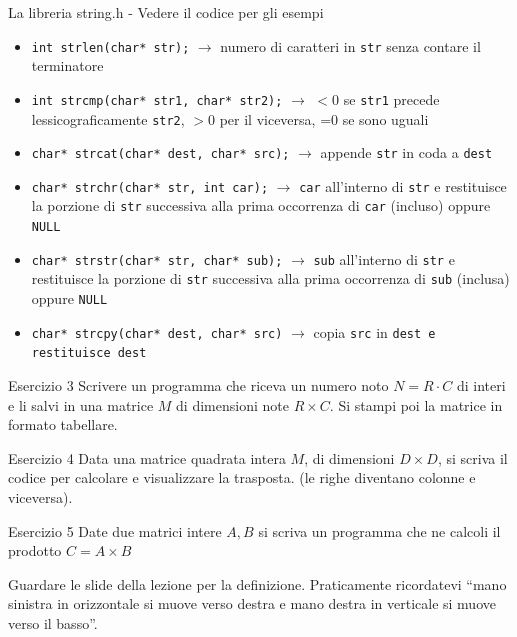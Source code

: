 \documentclass[handout]{beamer}
\begin{document}
\begin{frame}{La libreria string.h - Vedere il codice per gli esempi}
\begin{itemize}
	\item \texttt{int strlen(char* str);} $\rightarrow$ numero di caratteri in \texttt{str} senza contare il terminatore
	\item \texttt{int strcmp(char* str1, char* str2);} $\rightarrow$ $<$0 se \texttt{str1} precede lessicograficamente \texttt{str2}, $>$0 per il viceversa, =0 se sono uguali
	\item \texttt{char* strcat(char* dest, char* src);} $\rightarrow$ appende \texttt{str} in coda a \texttt{dest}
	\item \texttt{char* strchr(char* str, int car);} $\rightarrow$ \texttt{car} all'interno di \texttt{str} e restituisce la porzione di \texttt{str} successiva alla prima occorrenza di \texttt{car} (incluso) oppure \texttt{NULL}
	\item \texttt{char* strstr(char* str, char* sub);} $\rightarrow$ \texttt{sub} all'interno di \texttt{str} e restituisce la porzione di \texttt{str} successiva alla prima occorrenza di \texttt{sub} (inclusa) oppure \texttt{NULL}
	\item \texttt{char* strcpy(char* dest, char* src)} $\rightarrow$ copia \texttt{src} in \texttt{dest e restituisce \texttt{dest}}
\end{itemize}
\end{frame}

\begin{frame}{Esercizio 3}
Scrivere un programma che riceva un numero noto $N=R\cdot C$ di interi e li salvi in una matrice $M$ di dimensioni note $R \times C$. Si stampi poi la matrice in formato tabellare.
\end{frame}

\begin{frame}{Esercizio 4}
Data una matrice quadrata intera $M$, di dimensioni $D \times D$, si scriva il codice per calcolare e visualizzare la trasposta. (le righe diventano colonne e viceversa).
\end{frame}

\begin{frame}{Esercizio 5}
Date due matrici intere $A, B$ si scriva un programma che ne calcoli il prodotto $C=A\times B$

Guardare le slide della lezione per la definizione. Praticamente ricordatevi ``mano sinistra in orizzontale si muove verso destra e mano destra in verticale si muove verso il basso''.
\end{frame}
\end{document}
